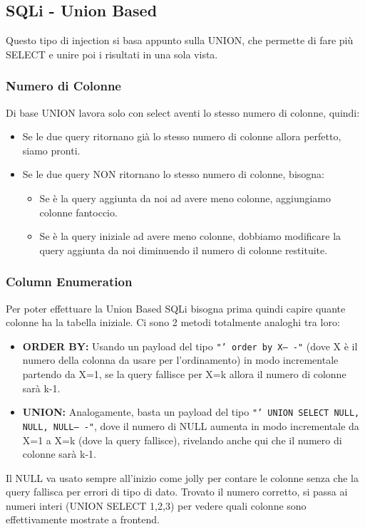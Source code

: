 \documentclass[12pt,a4paper]{report}
\begin{document}
	\subsection{SQLi - Union Based}
	Questo tipo di injection si basa appunto sulla UNION, che permette di fare più SELECT e unire poi i risultati in una sola vista.
	
	\subsubsection{Numero di Colonne}
	Di base UNION lavora solo con select aventi lo stesso numero di colonne, quindi:
	\begin{itemize}
		\item Se le due query ritornano già lo stesso numero di colonne allora perfetto, siamo pronti.
		\item Se le due query NON ritornano lo stesso numero di colonne, bisogna:
		\begin{itemize}
			\item Se è la query aggiunta da noi ad avere meno colonne, aggiungiamo colonne fantoccio.
			\item Se è la query iniziale ad avere meno colonne, dobbiamo modificare la query aggiunta da noi diminuendo il numero di colonne restituite.
		\end{itemize}
	\end{itemize}
	
	\subsubsection{Column Enumeration}
	Per poter effettuare la Union Based SQLi bisogna prima quindi capire quante colonne ha la tabella iniziale. Ci sono 2 metodi totalmente analoghi tra loro:
	\begin{itemize}
		\item \textbf{ORDER BY:} Usando un payload del tipo \texttt{"' order by X-- -"} (dove X è il numero della colonna da usare per l'ordinamento) in modo incrementale partendo da X=1, se la query fallisce per X=k allora il numero di colonne sarà k-1.
		\item \textbf{UNION:} Analogamente, basta un payload del tipo \texttt{"' UNION SELECT NULL, NULL, NULL-- -"}, dove il numero di NULL aumenta in modo incrementale da X=1 a X=k (dove la query fallisce), rivelando anche qui che il numero di colonne sarà k-1.
	\end{itemize}
	\begin{nota}
		Il NULL va usato sempre all'inizio come jolly per contare le colonne senza che la query fallisca per errori di tipo di dato. Trovato il numero corretto, si passa ai numeri interi (UNION SELECT 1,2,3) per vedere quali colonne sono effettivamente mostrate a frontend.
	\end{nota}
	
\end{document}
